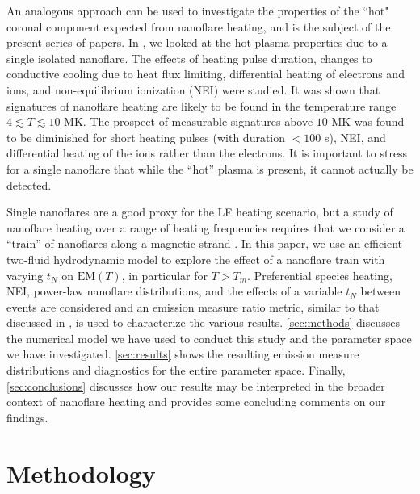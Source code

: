 \documentclass[preprint,linenumbers]{aastex}
\begin{document}
	\par An analogous approach can be used to investigate the properties of the ``hot" coronal component expected from nanoflare heating, and is the subject of the present series of papers. In \citet{barnes_inference_2016} , we looked at the hot plasma properties due to a single isolated nanoflare. The effects of heating pulse duration, changes to conductive cooling due to heat flux limiting, differential heating of electrons and ions, and non-equilibrium ionization (NEI) were studied. It was shown that signatures of nanoflare heating are likely to be found in the temperature range $4\lesssim T\lesssim 10$ MK. The prospect of measurable signatures above $10$ MK was found to be diminished for short heating pulses (with duration $<100$ s), NEI, and differential heating of the ions rather than the electrons. It is important to stress for a single nanoflare that while the ``hot'' plasma is present, it cannot actually be detected.
	\par Single nanoflares are a good proxy for the LF heating scenario, but a study of nanoflare heating over a range of heating frequencies requires that we consider a ``train'' of nanoflares along a magnetic strand \citep{viall_patterns_2011,warren_constraints_2011,reep_diagnosing_2013,cargill_modelling_2015}. In this paper, we use an efficient two-fluid hydrodynamic model to explore the effect of a nanoflare train with varying $t_N$ on $\mathrm{EM}(T)$, in particular for $T>T_m$. Preferential species heating, NEI, power-law nanoflare distributions, and the effects of a variable $t_N$ between events are considered and an emission measure ratio metric, similar to that discussed in \citet{brosius_pervasive_2014}, is used to characterize the various results. \autoref{sec:methods} discusses the numerical model we have used to conduct this study and the parameter space we have investigated. \autoref{sec:results} shows the resulting emission measure distributions and diagnostics for the entire parameter space. Finally, \autoref{sec:conclusions} discusses how our results may be interpreted in the broader context of nanoflare heating and provides some concluding comments on our findings.
	\section{Methodology}
	\label{sec:methods}
\end{document}

